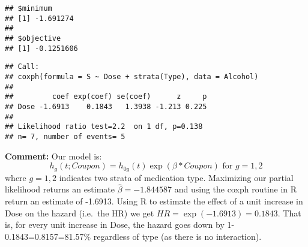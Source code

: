 \documentclass[
]{article}
\newenvironment{Shaded}{\begin{snugshade}}{\end{snugshade}}
\newcommand{\AttributeTok}[1]{\textcolor[rgb]{0.77,0.63,0.00}{#1}}
\newcommand{\DecValTok}[1]{\textcolor[rgb]{0.00,0.00,0.81}{#1}}
\newcommand{\FloatTok}[1]{\textcolor[rgb]{0.00,0.00,0.81}{#1}}
\newcommand{\FunctionTok}[1]{\textcolor[rgb]{0.00,0.00,0.00}{#1}}
\newcommand{\NormalTok}[1]{#1}
\newcommand{\OtherTok}[1]{\textcolor[rgb]{0.56,0.35,0.01}{#1}}
\newcommand{\SpecialCharTok}[1]{\textcolor[rgb]{0.00,0.00,0.00}{#1}}
\begin{document}
\begin{verbatim}
## $minimum
## [1] -1.691274
## 
## $objective
## [1] -0.1251606
\end{verbatim}

\begin{Shaded}
\end{Shaded}

\begin{verbatim}
## Call:
## coxph(formula = S ~ Dose + strata(Type), data = Alcohol)
## 
##         coef exp(coef) se(coef)      z     p
## Dose -1.6913    0.1843   1.3938 -1.213 0.225
## 
## Likelihood ratio test=2.2  on 1 df, p=0.138
## n= 7, number of events= 5
\end{verbatim}

\textbf{Comment:} Our model is: \[
h_g(t;Coupon) = h_{0g}(t)\exp(\beta * Coupon) \text{ for } g=1,2
\] where \(g=1,2\) indicates two strata of medication type. Maximizing
our partial likelihood returns an estimate \(\hat{\beta}=-1.844587\) and
using the coxph routine in R return an estimate of -1.6913. Using R to
estimate the effect of a unit increase in Dose on the hazard (i.e.~the
HR) we get \(\hat{HR}=\exp(-1.6913)=0.1843\). That is, for every unit
increase in Dose, the hazard goes down by 1-0.1843=0.8157=81.57\%
regardless of type (as there is no interaction).
\end{document}
